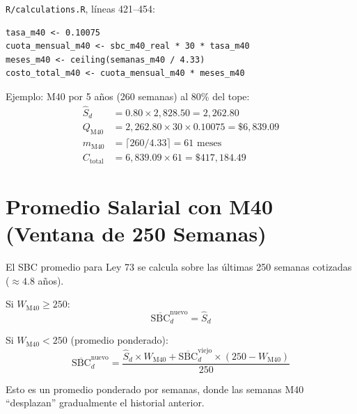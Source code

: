 \documentclass[11pt,a4paper]{report}
\theoremstyle{remark}
\begin{document}
\begin{tcolorbox}[colback=orange!5!white, colframe=orange!75!black, title=\textbf{Aplicaci\'on en C\'odigo}]
\texttt{R/calculations.R}, l\'ineas 421--454:
\begin{lstlisting}
tasa_m40 <- 0.10075
cuota_mensual_m40 <- sbc_m40_real * 30 * tasa_m40
meses_m40 <- ceiling(semanas_m40 / 4.33)
costo_total_m40 <- cuota_mensual_m40 * meses_m40
\end{lstlisting}

Ejemplo: M40 por 5 a\~nos (260 semanas) al 80\% del tope:
\begin{align*}
\hat{S}_d &= 0.80 \times 2{,}828.50 = 2{,}262.80 \\
Q_{\text{M40}} &= 2{,}262.80 \times 30 \times 0.10075 = \$6{,}839.09 \\
m_{\text{M40}} &= \lceil 260 / 4.33 \rceil = 61 \text{ meses} \\
C_{\text{total}} &= 6{,}839.09 \times 61 = \$417{,}184.49
\end{align*}
\end{tcolorbox}

\section{Promedio Salarial con M40 (Ventana de 250 Semanas)}

\begin{tcolorbox}[colback=blue!5!white, colframe=blue!75!black, title=\textbf{Definici\'on Formal}]
El SBC promedio para Ley 73 se calcula sobre las \'ultimas 250 semanas cotizadas ($\approx 4.8$ a\~nos).

Si $W_{\text{M40}} \geq 250$:
\begin{equation}
\overline{\text{SBC}}_d^{\text{nuevo}} = \hat{S}_d
\label{eq:sbc_m40_full}
\end{equation}

Si $W_{\text{M40}} < 250$ (promedio ponderado):
\begin{equation}
\overline{\text{SBC}}_d^{\text{nuevo}} = \frac{\hat{S}_d \times W_{\text{M40}} + \overline{\text{SBC}}_d^{\text{viejo}} \times (250 - W_{\text{M40}})}{250}
\label{eq:sbc_m40_partial}
\end{equation}

Esto es un promedio ponderado por semanas, donde las semanas M40 ``desplazan'' gradualmente el historial anterior.
\end{tcolorbox}
\end{document}
